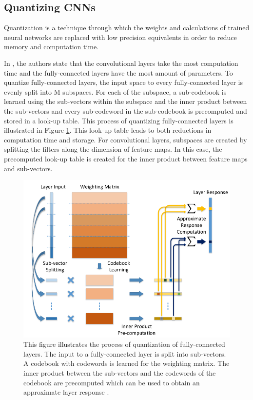 \subsection{Quantizing CNNs}

Quantization is a technique through which the weights and calculations of trained neural networks are replaced with low precision equivalents in order to reduce memory and computation time.

In \cite{DBLP:journals/corr/WuLWHC15}, the authors state that the convolutional layers take the most computation time and the fully-connected layers have the most amount of parameters. To quantize fully-connected layers, the input space to every fully-connected layer is evenly split into M subspaces. For each of the subspace, a sub-codebook is learned using the sub-vectors within the subspace and the inner product between the sub-vectors and every sub-codeword in the sub-codebook is precomputed and stored in a look-up table. This process of quantizing fully-connected layers is illustrated in Figure \ref{Fig:quantiz}. This look-up table leads to both reductions in computation time and storage. For convolutional layers, subspaces are created by splitting the filters along the dimension of feature maps. In this case, the precomputed look-up table is created for the inner product between feature maps and sub-vectors. 

	\begin{figure}[h]
		\centering
		\includegraphics[width=.7\linewidth]{images/quantization}
		\caption{This figure illustrates the process of quantization of fully-connected layers. The input to a fully-connected layer is split into sub-vectors. A codebook with codewords is learned for the weighting matrix. The inner product between the sub-vectors and the codewords of the codebook are precomputed which can be used to obtain an approximate layer response \cite{DBLP:journals/corr/WuLWHC15}.}
		\label{Fig:quantiz}
	\end{figure}


